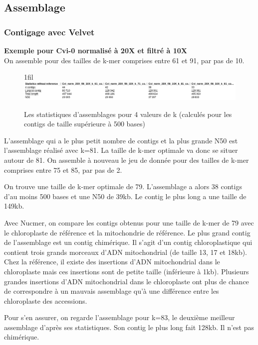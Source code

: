 \documentclass[a4paper]{article}
\makeatletter
\newcommand*{\centerfloat}{%
  \parindent \z@
  \leftskip \z@ \@plus 1fil \@minus \textwidth
  \rightskip\leftskip
  \parfillskip \z@skip}
\makeatother
\begin{document}
\subsection{Assemblage}

\subsubsection{Contigage avec Velvet}
\hspace{1.5cm}  \textbf{\small Exemple pour Cvi-0 normalisé à 20X et filtré à 10X}\\

On assemble pour des tailles de k-mer comprises entre 61 et 91, par pas de 10. 

\begin{figure}[!ht]
\centerfloat
\includegraphics[scale=0.4] {Assemblage/quast.png}
\caption{Les statistiques d'assemblages pour 4 valeurs de k (calculés pour les contigs de taille supérieure à 500 bases)}
\label{quast}
\end{figure}

L'assemblage qui a le plus petit nombre de contigs et la plus grande N50 est l'assemblage réalisé avec k=81. La taille de k-mer optimale va donc se situer autour de 81. On assemble à nouveau le jeu de donnée pour des tailles de k-mer comprises entre 75 et 85, par pas de 2.

On trouve une taille de k-mer optimale de 79. L'assemblage a alors 38 contigs d'au moins 500 bases et une N50 de 39kb. Le contig le plus long a une taille de 149kb. 

Avec Nucmer, on compare les contigs obtenus pour une taille de k-mer de 79 avec le chloroplaste de référence et la mitochondrie de référence. Le plus grand contig de l'assemblage est un contig chimérique. Il s'agit d'un contig chloroplastique qui contient trois grands morceaux d'ADN mitochondrial (de taille 13, 17 et 18kb). Chez la référence, il existe des insertions d'ADN mitochondrial dans le chloroplaste  mais ces insertions sont de petite taille (inférieure à 1kb). Plusieurs grandes insertions d'ADN mitochondrial dans le chloroplaste ont plus de chance de correspondre à un mauvais assemblage qu'à une différence entre les chloroplaste des accessions. 

Pour s'en assurer, on regarde l'assemblage pour k=83, le deuxième meilleur assemblage d'après ses statistiques. Son contig le plus long fait 128kb. Il n'est pas chimérique.
\end{document}

